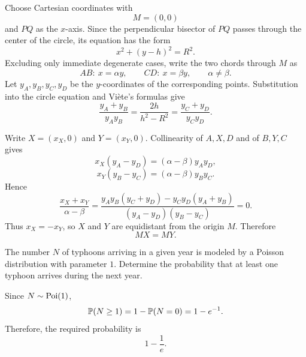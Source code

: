     \begin{solution}
        Choose Cartesian coordinates with
        \[
            M=(0,0)
        \]
        and $PQ$ as the $x$-axis. Since the perpendicular bisector of $PQ$
        passes through the center of the circle, its equation has the form
        \[
            x^2+(y-h)^2=R^2.
        \]
        Excluding only immediate degenerate cases, write the two chords through
        $M$ as
        \[
            AB:\ x=\alpha y,
            \qquad
            CD:\ x=\beta y,
            \qquad
            \alpha\neq\beta.
        \]
        Let $y_A,y_B,y_C,y_D$ be the $y$-coordinates of the corresponding
        points. Substitution into the circle equation and Vi\`ete's formulas
        give
        \[
            \frac{y_A+y_B}{y_Ay_B}
            =
            \frac{2h}{h^2-R^2}
            =
            \frac{y_C+y_D}{y_Cy_D}.
        \]

        Write $X=(x_X,0)$ and $Y=(x_Y,0)$. Collinearity of $A,X,D$ and of
        $B,Y,C$ gives
        \[
            x_X(y_A-y_D)
            =
            (\alpha-\beta)y_Ay_D,
        \]
        \[
            x_Y(y_B-y_C)
            =
            (\alpha-\beta)y_By_C.
        \]
        Hence
        \[
            \frac{x_X+x_Y}{\alpha-\beta}
            =
            \frac{
                y_Ay_B(y_C+y_D)-y_Cy_D(y_A+y_B)
            }{
                (y_A-y_D)(y_B-y_C)
            }
            =0.
        \]
        Thus $x_X=-x_Y$, so $X$ and $Y$ are equidistant from the origin $M$.
        Therefore
        \[
            \boxed{MX=MY}.
        \]
    \end{solution}

    \begin{expectedproblem}
        The number $N$ of typhoons arriving in a given year is modeled by a
        Poisson distribution with parameter $1$. Determine the probability that
        at least one typhoon arrives during the next year.
    \end{expectedproblem}

    \begin{solution}
        Since $N\sim\operatorname{Poi}(1)$,
        \[
            \mathbb{P}(N\geq1)
            =
            1-\mathbb{P}(N=0)
            =
            1-e^{-1}.
        \]
        Therefore, the required probability is
        \[
            \boxed{1-\frac{1}{e}}.
        \]
    \end{solution}

